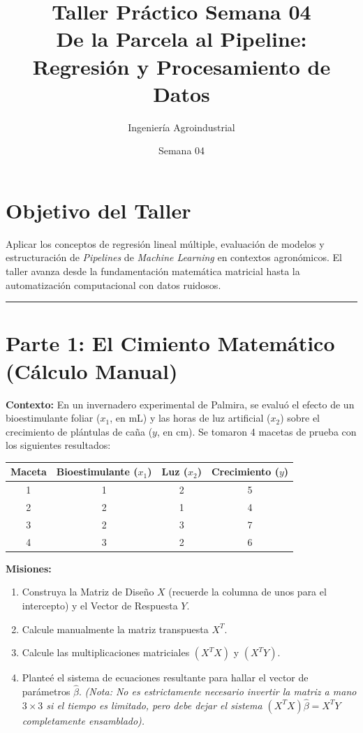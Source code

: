 \documentclass[12pt,a4paper]{article}
\title{\textbf{Taller Práctico Semana 04}\\ \Large De la Parcela al Pipeline: Regresión y Procesamiento de Datos}
\author{Ingeniería Agroindustrial}
\date{Semana 04}
\begin{document}
\sloppy %

\maketitle

\section*{Objetivo del Taller}
Aplicar los conceptos de regresión lineal múltiple, evaluación de modelos y estructuración de \textit{Pipelines} de \textit{Machine Learning} en contextos agronómicos. El taller avanza desde la fundamentación matemática matricial hasta la automatización computacional con datos ruidosos.

\vspace{0.5cm}
\noindent\rule{\textwidth}{0.4pt} %
\vspace{0.5cm}

\section{Parte 1: El Cimiento Matemático (Cálculo Manual)}

\textbf{Contexto:} En un invernadero experimental de Palmira, se evaluó el efecto de un bioestimulante foliar ($x_1$, en mL) y las horas de luz artificial ($x_2$) sobre el crecimiento de plántulas de caña ($y$, en cm). Se tomaron 4 macetas de prueba con los siguientes resultados:

\begin{table}[h]
\centering
\begin{tabular}{cccc}
\toprule
\textbf{Maceta} & \textbf{Bioestimulante ($x_1$)} & \textbf{Luz ($x_2$)} & \textbf{Crecimiento ($y$)} \\
\midrule
1 & 1 & 2 & 5 \\
2 & 2 & 1 & 4 \\
3 & 2 & 3 & 7 \\
4 & 3 & 2 & 6 \\
\bottomrule
\end{tabular}
\end{table}

\textbf{Misiones:}
\begin{enumerate}[label=\alph*)]
    \item Construya la Matriz de Diseño $X$ (recuerde la columna de unos para el intercepto) y el Vector de Respuesta $Y$.
    \item Calcule manualmente la matriz transpuesta $X^T$.
    \item Calcule las multiplicaciones matriciales $(X^T X)$ y $(X^T Y)$.
    \item Planteé el sistema de ecuaciones resultante para hallar el vector de parámetros $\hat{\beta}$. \textit{(Nota: No es estrictamente necesario invertir la matriz a mano $3 \times 3$ si el tiempo es limitado, pero debe dejar el sistema $(X^T X)\hat{\beta} = X^T Y$ completamente ensamblado).}



\end{enumerate}
\end{document}
